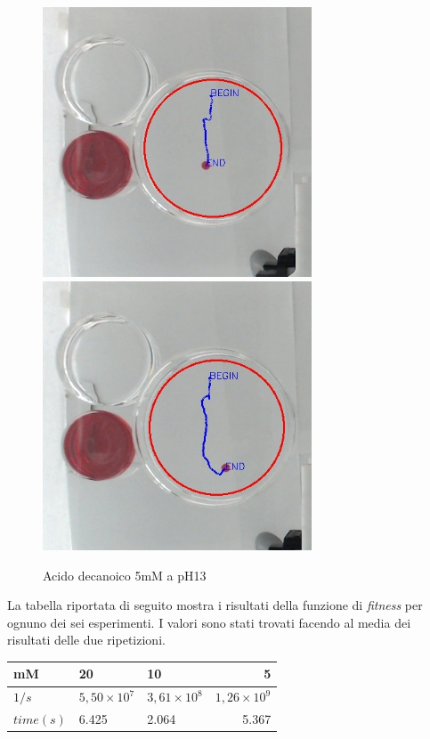 \begin{figure}[h]
	\centering
   		{\includegraphics[width=8cm]{immagini/5mMpH13-1.jpg}}
 	\hspace{2mm}   	
		{\includegraphics[width=8cm]{immagini/5mMpH13-2.jpg}}
	\caption{Acido decanoico 5mM a pH13}
\end{figure}
\pagebreak
La tabella riportata di seguito mostra i risultati della funzione di \emph{fitness} per ognuno dei sei esperimenti. I valori sono stati trovati facendo al media dei risultati delle due ripetizioni.
\begin{center}
\begin{tabular}{|l|l|l|r|}
	\hline
	mM&20&10&5\\
	\hline
	$1/s$&$5,50\times {10}^{7}$&$3,61\times {10}^{8}$&$1,26\times {10}^{9}$\\
	\hline
	$time(s)$& 6.425 & 2.064 & 5.367\\
	\hline
\end{tabular}
\end{center}
\pagebreak























